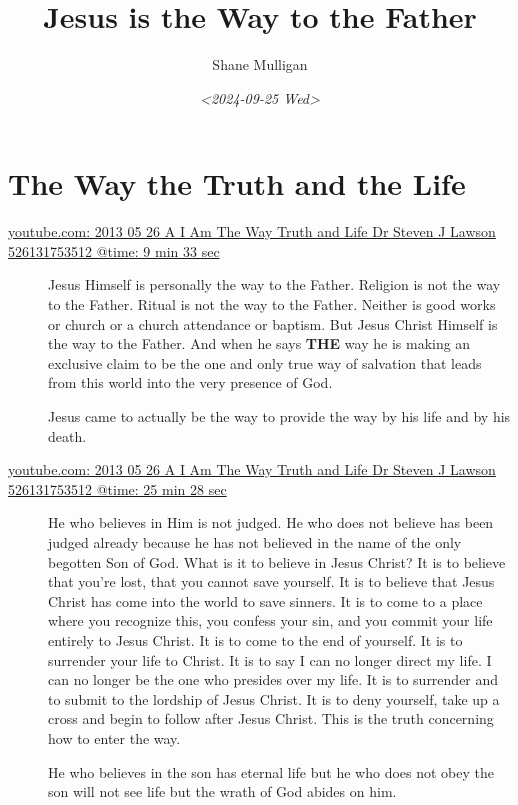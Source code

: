 \documentclass[11pt]{article}
\author{Shane Mulligan}
\date{\textit{<2024-09-25 Wed>}}
\title{Jesus is the Way to the Father}
\begin{document}
\maketitle

\section{The Way the Truth and the Life}
\label{sec:orgcaa605d}

\begin{description}
\item[{\href{https://youtube.com/watch?v=-33jh183A1s\&t=573}{youtube.com: 2013 05 26 A I Am The Way  Truth and Life   Dr  Steven J  Lawson   526131753512 @time: 9 min 33 sec}}] Jesus Himself is personally the way to the
Father. Religion is not the way to the
Father. Ritual is not the way to the
Father. Neither is good works or church
or a church attendance or baptism. But
Jesus Christ Himself is the way to the
Father. And when he says \textbf{THE} way he is
making an exclusive claim to be the one
and only true way of salvation that
leads from this world into the very
presence of God.

Jesus came to actually be the way to provide the
way by his life and by his death.

\item[{\href{https://youtube.com/watch?v=-33jh183A1s\&t=1528}{youtube.com: 2013 05 26 A I Am The Way  Truth and Life   Dr  Steven J  Lawson   526131753512 @time: 25 min 28 sec}}] He who believes in Him is not judged. He who
does not believe has been judged already
because he has not believed in the name
of the only begotten Son of God. What is
it to believe in Jesus Christ? It is to
believe that you're lost, that you cannot
save yourself. It is to believe that
Jesus Christ has come into the world to
save sinners. It is to come to a place
where you recognize this, you confess
your sin, and you commit your life
entirely to Jesus Christ. It is to come
to the end of yourself. It is to
surrender your life to Christ. It is to
say I can no longer direct my life. I can
no longer be the one who presides over
my life. It is to surrender and to submit
to the lordship of Jesus Christ. It is to
deny yourself, take up a cross and begin
to follow after Jesus Christ. This is the
truth concerning how to enter the way.

He who believes in the son
has eternal life but he who does not
obey the son will not see life but the
wrath of God abides on him.


\end{description}
\end{document}
